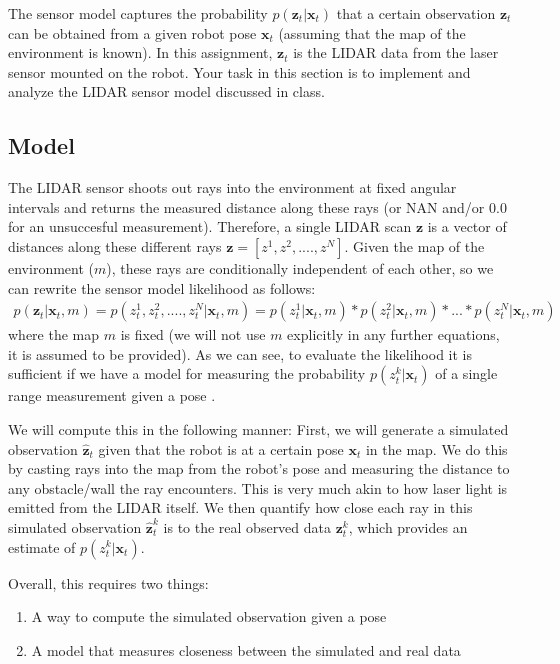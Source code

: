 \documentclass[final]{article}
\begin{document}
The sensor model captures the probability $p(\mathbf{z}_t | \mathbf{x}_t)$ that a certain observation $\mathbf{z}_t$ can be obtained from a given robot pose $\mathbf{x}_t$ (assuming that the map of the environment is known). In this assignment, $\mathbf{z}_t$ is the LIDAR data from the laser sensor mounted on the robot. Your task in this section is to implement and analyze the LIDAR sensor model discussed in class.

\subsection{Model}
The LIDAR sensor shoots out rays into the environment at fixed angular intervals and returns the measured distance along these rays (or NAN and/or 0.0 for an unsuccesful measurement). Therefore, a single LIDAR scan $\mathbf{z}$ is a vector of distances along these different rays $\mathbf{z} = \left[z^1, z^2, ...., z^N\right]$. Given the map of the environment ($m$), these rays are conditionally independent of each other, so we can rewrite the sensor model likelihood as follows:
\begin{align}
p(\mathbf{z}_t | \mathbf{x}_t, m) = p(z_t^1, z_t^2, ...., z_t^N | \mathbf{x}_t, m) = p(z_t^1 | \mathbf{x}_t, m) * p(z_t^2 | \mathbf{x}_t, m) * ... * p(z_t^N | \mathbf{x}_t ,m )
\end{align}
where the map $m$ is fixed (we will not use $m$ explicitly in any further equations, it is assumed to be provided). As we can see, to evaluate the likelihood it is sufficient if we have a model for measuring the probability $p(z_t^k | \mathbf{x}_t)$ of a single range measurement given a pose . 

We will compute this in the following manner: First, we will generate a simulated observation $\hat{\mathbf{z}}_t$ given that the robot is at a certain pose $\mathbf{x}_t$ in the map. We do this by casting rays into the map from the robot's pose and measuring the distance to any obstacle/wall the ray encounters. This is very much akin to how laser light is emitted from the LIDAR itself. We then quantify how close each ray in this simulated observation $\hat{\mathbf{z}}^k_t$ is to the real observed data $\mathbf{z}^k_t$, which provides an estimate of $p(z_t^k | \mathbf{x}_t)$. 

Overall, this requires two things: 
\begin{enumerate}
\item A way to compute the simulated observation given a pose
\item A model that measures closeness between the simulated and real data
\end{enumerate}
\end{document}
